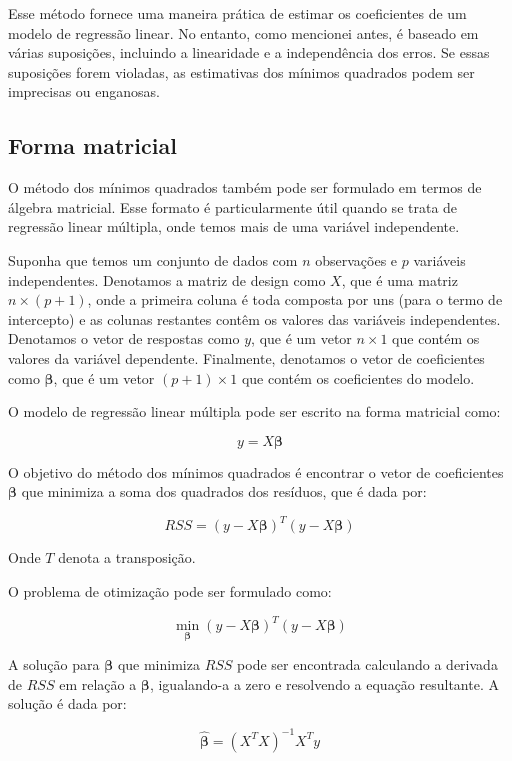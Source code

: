 \documentclass[12pt,a4paper, brazil]{article}
\begin{document}
Esse método fornece uma maneira prática de estimar os coeficientes de um modelo de regressão linear. No entanto, como mencionei antes, é baseado em várias suposições, incluindo a linearidade e a independência dos erros. Se essas suposições forem violadas, as estimativas dos mínimos quadrados podem ser imprecisas ou enganosas.

\subsection{Forma matricial}

O método dos mínimos quadrados também pode ser formulado em termos de álgebra matricial. Esse formato é particularmente útil quando se trata de regressão linear múltipla, onde temos mais de uma variável independente.

Suponha que temos um conjunto de dados com $n$ observações e $p$ variáveis independentes. Denotamos a matriz de design como $X$, que é uma matriz $n \times (p+1)$, onde a primeira coluna é toda composta por uns (para o termo de intercepto) e as colunas restantes contêm os valores das variáveis independentes. Denotamos o vetor de respostas como $y$, que é um vetor $n \times 1$ que contém os valores da variável dependente. Finalmente, denotamos o vetor de coeficientes como $\boldsymbol{\beta}$, que é um vetor $(p+1) \times 1$ que contém os coeficientes do modelo.

O modelo de regressão linear múltipla pode ser escrito na forma matricial como:

$$y = X\boldsymbol{\beta}$$

O objetivo do método dos mínimos quadrados é encontrar o vetor de coeficientes $\boldsymbol{\beta}$ que minimiza a soma dos quadrados dos resíduos, que é dada por:

$$RSS = (y - X\boldsymbol{\beta})^T(y - X\boldsymbol{\beta})$$

\noindent Onde $T$ denota a transposição.

O problema de otimização pode ser formulado como:

$$\min_{\boldsymbol{\beta}} (y - X\boldsymbol{\beta})^T(y - X\boldsymbol{\beta})$$

A solução para $\boldsymbol{\beta}$ que minimiza $RSS$ pode ser encontrada calculando a derivada de $RSS$ em relação a $\boldsymbol{\beta}$, igualando-a a zero e resolvendo a equação resultante. A solução é dada por:

$$\hat{\boldsymbol{\beta}} = (X^TX)^{-1}X^Ty$$
\end{document}
